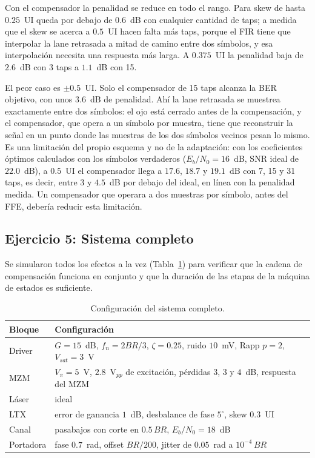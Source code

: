 Con el compensador la penalidad se reduce en todo el rango. Para skew de
hasta $0.25$~UI queda por debajo de $0.6$~dB con cualquier cantidad de
taps; a medida que el skew se acerca a $0.5$~UI hacen falta más taps,
porque el FIR tiene que interpolar la lane retrasada a mitad de camino
entre dos símbolos, y esa interpolación necesita una respuesta más larga.
A $0.375$~UI la penalidad baja de $2.6$~dB con 3 taps a $1.1$~dB con 15.

El peor caso es $\pm0.5$~UI. Solo el compensador de 15 taps alcanza la
BER objetivo, con unos $3.6$~dB de penalidad. Ahí la lane retrasada se
muestrea exactamente entre dos símbolos: el ojo está cerrado antes de la
compensación, y el compensador, que opera a un símbolo por muestra, tiene
que reconstruir la señal en un punto donde las muestras de los dos
símbolos vecinos pesan lo mismo. Es una limitación del propio esquema y
no de la adaptación: con los coeficientes óptimos calculados con los
símbolos verdaderos ($E_b/N_0 = 16$~dB, SNR ideal de $22.0$~dB), a
$0.5$~UI el compensador llega a $17.6$, $18.7$ y $19.1$~dB con 7, 15 y 31
taps, es decir, entre $3$ y $4.5$~dB por debajo del ideal, en línea con la
penalidad medida. Un compensador que operara a dos muestras por símbolo,
antes del FFE, debería reducir esta limitación.

\subsection*{Ejercicio 5: Sistema completo}

Se simularon todos los efectos a la vez (Tabla~\ref{tab:ej5_cfg}) para
verificar que la cadena de compensación funciona en conjunto y que la
duración de las etapas de la máquina de estados es suficiente.

\begin{table}[H]
\centering
\small
\begin{tabular}{ll}
\toprule
Bloque & Configuración \\
\midrule
Driver  & $G = 15$~dB, $f_n = 2BR/3$, $\zeta = 0.25$, ruido $10$~mV, Rapp $p = 2$, $V_{sat} = 3$~V \\
MZM     & $V_\pi = 5$~V, $2.8$~V$_{pp}$ de excitación, pérdidas $3$, $3$ y $4$~dB, respuesta del MZM \\
Láser   & ideal \\
LTX     & error de ganancia $1$~dB, desbalance de fase $5^\circ$, skew $0.3$~UI \\
Canal   & pasabajos con corte en $0.5\,BR$, $E_b/N_0 = 18$~dB \\
Portadora & fase $0.7$~rad, offset $BR/200$, jitter de $0.05$~rad a $10^{-4}\,BR$ \\
\bottomrule
\end{tabular}
\caption{Configuración del sistema completo.}
\label{tab:ej5_cfg}
\end{table}

